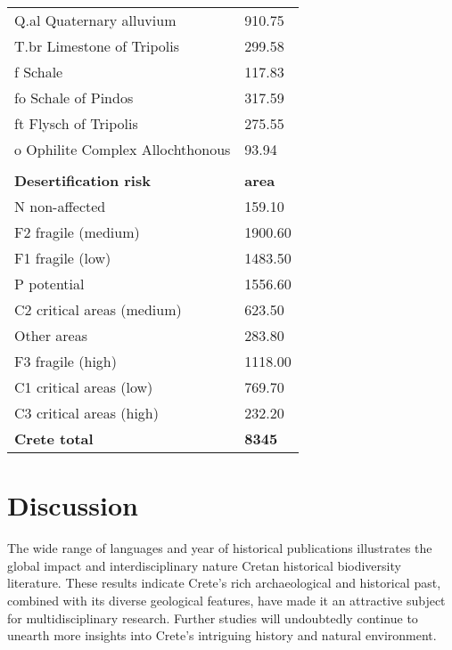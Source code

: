 \begin{longtable}{ll}
Q.al Quaternary alluvium                           & 910.75           \\
T.br  Limestone of Tripolis                        & 299.58           \\
f Schale                                           & 117.83           \\
fo Schale of Pindos                                & 317.59           \\
ft Flysch of Tripolis                              & 275.55           \\
o Ophilite Complex Allochthonous                   & 93.94            \\
                                                   &                  \\
\textbf{Desertification risk}                      & \textbf{area}    \\
N non-affected                                     & 159.10           \\
F2 fragile (medium)                                & 1900.60          \\
F1 fragile (low)                                   & 1483.50          \\
P potential                                        & 1556.60          \\
C2 critical areas (medium)                         & 623.50           \\
Other areas                                        & 283.80           \\
F3 fragile (high)                                  & 1118.00          \\
C1 critical areas (low)                            & 769.70           \\
C3 critical areas (high)                           & 232.20           \\
\textbf{Crete total}                               & \textbf{8345}

\end{longtable}


\section{Discussion}\label{crete_idea_discussion}

The wide range of languages and year of historical publications illustrates the
global impact and interdisciplinary nature Cretan historical biodiversity literature.
These results indicate Crete's rich archaeological and historical past,
combined with its diverse geological features, have made it an attractive subject
for multidisciplinary research. Further studies will undoubtedly continue to
unearth more insights into Crete's intriguing history and natural environment.


